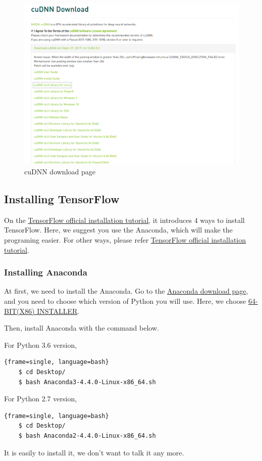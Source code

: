 \documentclass[12pt,letterpaper]{article}
\begin{document}
		\begin{figure}[http]
		\centering
		\includegraphics[scale=0.35]{./cuDNNPage.png}
		\caption{\label{Fig:cuDNNPage}cuDNN download page}
	\end{figure} 
	\subsection{Installing TensorFlow}
	\label{sec:InstallationTensorFlow}
	On the \href{https://www.tensorflow.org/install/install_linux}{TensorFlow official installation tutorial}, it introduces 4 ways to install TensorFlow. Here, we suggest you use the Anaconda, which will make the programing easier. For other ways, please refer \href{https://www.tensorflow.org/install/install_linux}{TensorFlow official installation tutorial}.
	\subsubsection{Installing Anaconda}
	At first, we need to install the Anaconda. Go to the \href{https://www.continuum.io/downloads}{Anaconda download page}, and you need to choose which version of Python you will use. Here, we choose \href{https://repo.continuum.io/archive/Anaconda3-4.4.0-Linux-x86_64.sh}{64-BIT(X86) INSTALLER}. \par
	Then, install Anaconda with the command below.\par
	For Python 3.6 version,
	\begin{lstlisting}{frame=single, language=bash}
	$ cd Desktop/
	$ bash Anaconda3-4.4.0-Linux-x86_64.sh
	\end{lstlisting}
	For Python 2.7 version,
	\begin{lstlisting}{frame=single, language=bash}
	$ cd Desktop/
	$ bash Anaconda2-4.4.0-Linux-x86_64.sh
	\end{lstlisting}
	It is easily to install	it, we don't want to talk it any more.
	
\end{document}
